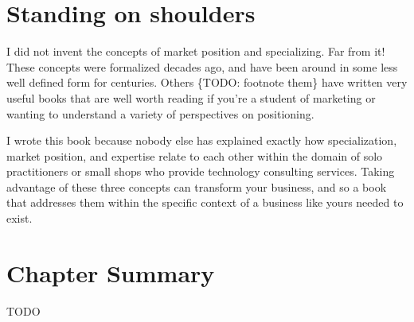 \section{Standing on shoulders}

I did not invent the concepts of market position and specializing. Far from it! These concepts were formalized decades ago, and have been around in some less well defined form for centuries. Others \{TODO: footnote them\} have written very useful books that are well worth reading if you're a student of marketing or wanting to understand a variety of perspectives on positioning.

I wrote this book because nobody else has explained exactly how specialization, market position, and expertise relate to each other within the domain of solo practitioners or small shops who provide technology consulting services. Taking advantage of these three concepts can transform your business, and so a book that addresses them within the specific context of a business like yours needed to exist.

\section{Chapter Summary}

TODO